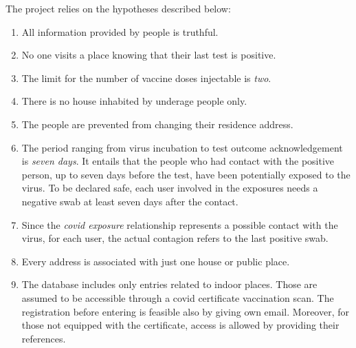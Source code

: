 \label{section 2}
The project relies on the hypotheses described below:

\begin{enumerate}
    \item All information provided by people is truthful.
    \item \label{assumption_2} No one visits a place knowing that their last test is positive. 
    \item The limit for the number of vaccine doses injectable is \emph{two}.
    \item There is no house inhabited by underage people only.
    \item The people are prevented from changing their residence address.
    \item The period ranging from virus incubation to test outcome acknowledgement is \emph{seven days}. It entails that the people who had contact with the positive person, up to seven days before the test, have been potentially exposed to the virus. To be declared safe, each user involved in the exposures needs a negative swab at least seven days after the contact.
    \item Since the \textit{covid exposure} relationship represents a possible contact with the virus, for each user, the actual contagion refers to the last positive swab. 
    \item Every address is associated with just one house or public place.
    \item The database includes only entries related to indoor places. Those are assumed to be accessible through a covid certificate vaccination scan. The registration before entering is feasible also by giving own email. Moreover, for those not equipped with the certificate, access is allowed by providing their references. 
\end{enumerate}    
    
